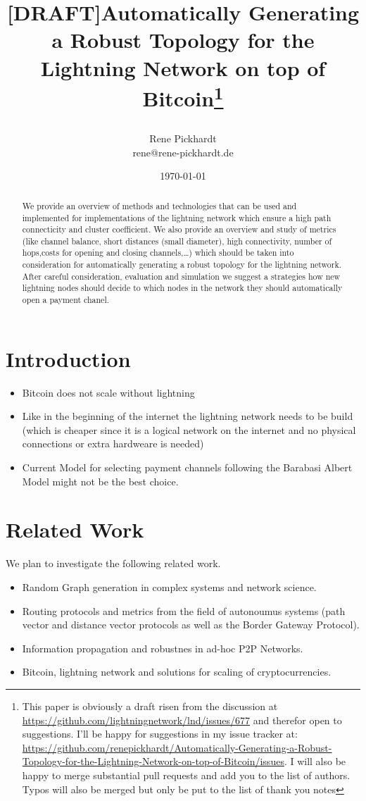 \documentclass{article}
\title{[DRAFT]Automatically Generating a Robust Topology for the Lightning Network on top of Bitcoin\thanks{This paper is obviously a draft risen from the discussion at \url{https://github.com/lightningnetwork/lnd/issues/677} and therefor open to suggestions. I'll be happy for suggestions in my issue tracker at: \url{https://github.com/renepickhardt/Automatically-Generating-a-Robust-Topology-for-the-Lightning-Network-on-top-of-Bitcoin/issues}. I will also be happy to merge substantial pull requests and add you to the list of authors. Typos will also be merged but only be put to the list of thank you notes}
\author{Rene Pickhardt \\
	rene@rene-pickhardt.de
	}
}
\date{\today}
\begin{document}
\maketitle

\begin{abstract}

We provide an overview of methods and technologies that can be used and implemented for implementations of the lightning network which ensure a high path connecticity and cluster coefficient. 
We also provide an overview and study of metrics (like channel balance, short distances (small diameter), high connectivity, number of hops,costs for opening and closing channels,\dots) which should be taken into consideration for automatically generating a robust topology for the lightning network.
After careful consideration, evaluation and simulation we suggest a strategies how new lightning nodes should decide to which nodes in the network they should automatically open a payment chanel. 
\end{abstract}

\section{Introduction}
\begin{itemize}
\item Bitcoin does not scale without lightning
\item Like in the beginning of the internet the lightning network needs to be build (which is cheaper since it is a logical network on the internet and no physical connections or extra hardweare is needed)
\item Current Model for selecting payment channels following the Barabasi Albert Model might not be the best choice.
\end{itemize}


\section{Related Work}
We plan to investigate the following related work. 
\begin{itemize}
\item Random Graph generation in complex systems and network science.
\item Routing protocols and metrics from the field of autonoumus systems (path vector and distance vector protocols as well as the Border Gateway Protocol). 
\item Information propagation and robustnes in ad-hoc P2P Networks.
\item Bitcoin, lightning network and solutions for scaling of cryptocurrencies.
\end{itemize}
\end{document}
